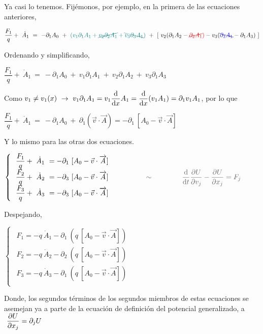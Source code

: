 Ya casi lo tenemos.  Fijémonos, por ejemplo, en la primera de las ecuaciones anteriores,


$\dfrac{F_1}{q} + \ \dot A_1 \ =\ -\partial_1A_0\ + \  \textcolor{teal}{( v_1\partial_1 A_1 + \cancel{v_2 \partial_2 A_1} + \bcancel{ v_3 \partial_3 A_1 } ) } \ + \ [\ v_2(\partial_1 A_2 - \textcolor{red}{\cancel{\partial_2 A_1})} - v_3(\textcolor{blue}{ \bcancel{\partial_3 A_1 }} - \partial_1 A_3) \ ]$

Ordenando y simplificando,

$\dfrac{F_1}{q} + \ \dot A_1 \ =\ -\partial_1A_0\ + \  v_1\partial_1 A_1  \ + \  v_2\partial_1 A_2 \ +  \ v_3 \partial_1 A_3$

Como $v_1\neq v_1(x) \ \to \ v_1 \partial_1 A_1 = v_1 \displaystyle \dv{x} A_1 = \dv{x} (v_1 A_1 )= \partial_1 v_1 A_1$, por lo que

$\dfrac{F_1}{q} + \ \dot A_1 \ =\ -\partial_1A_0\ + \  \partial_1 (\vec v \cdot \overrightarrow A) = -\partial_1 \ [A_0-\vec v \cdot \overrightarrow A]$


Y lo mismo para las otras dos ecuaciones.

$\begin{cases}
\ \ \dfrac{F_1}{q} + \ \dot A_1 \  = -\partial_1 \ [A_0-\vec v \cdot \overrightarrow A]\\
\ \ \dfrac{F_2}{q} + \ \dot A_2 \  = -\partial_3 \ [A_0-\vec v \cdot \overrightarrow A] \\
\ \ \dfrac{F_3}{q} + \ \dot A_3 \  = -\partial_3 \ [A_0-\vec v \cdot \overrightarrow A]	
\end{cases}
\textcolor{gris}{\qquad \qquad \sim \qquad \qquad \displaystyle \dv{t}\pdv{U}{v_j}-\pdv{U}{x_j}=F_j}$

Despejando,

$\begin{cases}
\ \ F_1 =  -q\ \dot A_1 - \partial_1 \ \left( q\ [A_0-\vec v \cdot \overrightarrow A] \right) \\	
\ \ F_2 =  -q\ \dot A_2 - \partial_2 \ \left( q\ [A_0-\vec v \cdot \overrightarrow A] \right) \\
\ \ F_3 =  -q\ \dot A_3 - \partial_1 \ \left( q\ [A_0-\vec v \cdot \overrightarrow A] \right) \\
\end{cases}$


Donde, los segundos términos de los segundos miembros de estas ecuaciones se asemejan ya a parte de la ecuación de definición del potencial generalizado, a $\ \displaystyle \pdv{U}{x_j}=\partial_j U$

